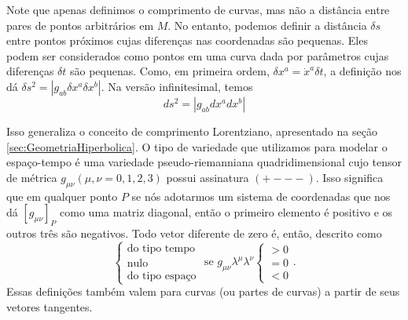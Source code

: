 Note que apenas definimos o comprimento de curvas, mas não a distância entre pares de pontos arbitrários em $M$. No entanto, podemos definir a distância $\delta s$ entre pontos próximos cujas diferenças nas coordenadas são pequenas. Eles podem ser considerados como pontos em uma curva dada por parâmetros cujas diferenças $\delta t$ são pequenas. Como, em primeira ordem, $\delta x^a= \dot{x}^a \delta t$, a definição nos dá $\delta s^2 = |g_{ab}\delta x^a\delta x^b|$. Na versão infinitesimal, temos
\begin{equation}\label{eq:ElementoDeLinhaVariedade}
	ds^2 = |g_{ab}dx^adx^b|
\end{equation}

Isso generaliza o conceito de comprimento Lorentziano, apresentado na seção \ref{sec:GeometriaHiperbolica}.
O tipo de variedade que utilizamos para modelar o espaço-tempo é uma variedade pseudo-riemanniana quadridimensional cujo tensor de métrica $g_{\mu\nu} (\mu,\nu=0,1,2,3)$ possui assinatura $(+---)$. Isso significa que  em qualquer ponto $P$ se nós adotarmos um sistema de coordenadas que nos dá $[g_{\mu\nu}]_P$ como uma matriz diagonal, então o primeiro elemento é positivo e os outros três são negativos. Todo vetor diferente de zero é, então, descrito como
\[
\left\{\begin{array}{l}{\text {do tipo tempo}} \\ {\text {nulo}} \\ {\text {do tipo espaço}}\end{array} \text { se } g_{\mu \nu} \lambda^{\mu} \lambda^{\nu}\left\{\begin{array}{l}{>0} \\ {=0} \\ {<0}\end{array}\right.\right. .
\]
Essas definições também valem para curvas (ou partes de curvas) a partir de seus vetores tangentes.